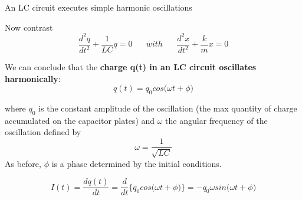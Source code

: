 %
%
%

\begin{frame}{An LC circuit executes simple harmonic oscillations}

Now contrast
\begin{equation*}
    \frac{d^2q}{dt^2} + \frac{1}{LC} q = 0
    \;\;\;\;\;\; with \;\;\;\;\;\;
    \frac{d^2x}{dt^2} + \frac{k}{m} x = 0
\end{equation*}

We can conclude that the {\bf charge q(t) in an LC circuit oscillates harmonically}:
\begin{equation*}
   q(t) = q_0 cos\Big( \omega t + \phi \Big)
\end{equation*}

where $q_0$ is the constant amplitude of the oscillation (the max quantity of
charge accumulated on the capacitor plates) and
$\omega$ the angular frequency of the oscillation defined by
\begin{equation*}
   \omega = \frac{1}{\sqrt{LC}}
\end{equation*}
As before, $\phi$ is a phase determined by the initial conditions.

\begin{equation*}
   I(t) = \frac{dq(t)}{dt} =
       \frac{d}{dt} \Big\{ q_0 cos\Big( \omega t + \phi \Big) \Big\} =
        - q_0 \omega sin\Big( \omega t + \phi \Big)
\end{equation*}

\end{frame}

%
%
%

